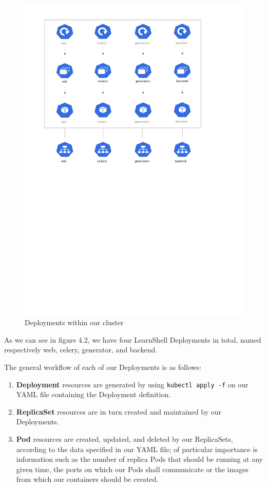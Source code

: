 \documentclass[thesis=B,english]{FITthesis}[2019/12/23]
\begin{document}
\begin{figure}[H]
\centering
\caption{Deployments within our cluster}
\hspace*{-2cm}
\includegraphics[scale=0.5]{deployment-diagram}
\end{figure}

As we can see in figure 4.2, we have four LearnShell Deployments in total, named respectively web, celery, generator, and backend.

The general workflow of each of our Deployments is as follows:

\begin{enumerate}
  \setlength\itemsep{0em}
  \item \textbf{Deployment} resources are generated by using \verb|kubectl apply -f| on our YAML file containing the Deployment definition.
  \item \textbf{ReplicaSet} resources are in turn created and maintained by our Deployments.
  \item \textbf{Pod} resources are created, updated, and deleted by our ReplicaSets, according to the data specified in our YAML file; of particular importance is information such as the number of replica Pods that should be running at any given time, the ports on which our Pods shall communicate or the images from which our containers should be created.
\end{enumerate}
\end{document}

